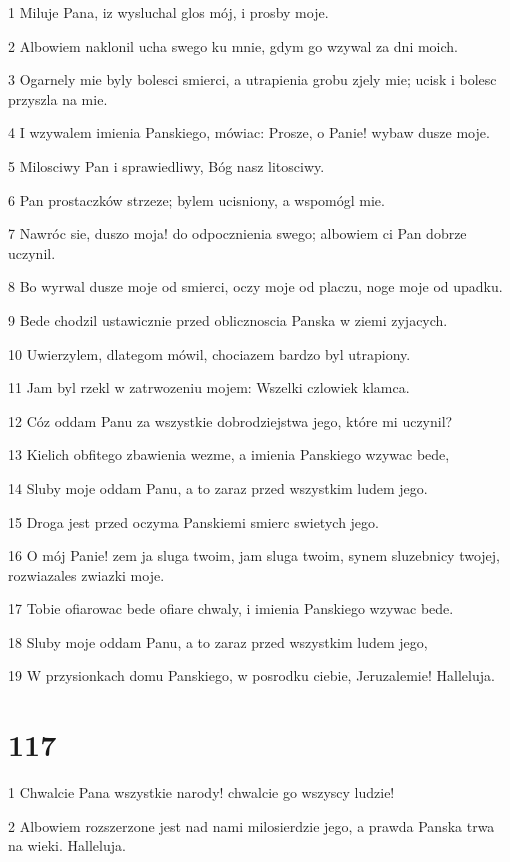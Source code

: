 \par 1 Miluje Pana, iz wysluchal glos mój, i prosby moje.
\par 2 Albowiem naklonil ucha swego ku mnie, gdym go wzywal za dni moich.
\par 3 Ogarnely mie byly bolesci smierci, a utrapienia grobu zjely mie; ucisk i bolesc przyszla na mie.
\par 4 I wzywalem imienia Panskiego, mówiac: Prosze, o Panie! wybaw dusze moje.
\par 5 Milosciwy Pan i sprawiedliwy, Bóg nasz litosciwy.
\par 6 Pan prostaczków strzeze; bylem ucisniony, a wspomógl mie.
\par 7 Nawróc sie, duszo moja! do odpocznienia swego; albowiem ci Pan dobrze uczynil.
\par 8 Bo wyrwal dusze moje od smierci, oczy moje od placzu, noge moje od upadku.
\par 9 Bede chodzil ustawicznie przed oblicznoscia Panska w ziemi zyjacych.
\par 10 Uwierzylem, dlategom mówil, chociazem bardzo byl utrapiony.
\par 11 Jam byl rzekl w zatrwozeniu mojem: Wszelki czlowiek klamca.
\par 12 Cóz oddam Panu za wszystkie dobrodziejstwa jego, które mi uczynil?
\par 13 Kielich obfitego zbawienia wezme, a imienia Panskiego wzywac bede,
\par 14 Sluby moje oddam Panu, a to zaraz przed wszystkim ludem jego.
\par 15 Droga jest przed oczyma Panskiemi smierc swietych jego.
\par 16 O mój Panie! zem ja sluga twoim, jam sluga twoim, synem sluzebnicy twojej, rozwiazales zwiazki moje.
\par 17 Tobie ofiarowac bede ofiare chwaly, i imienia Panskiego wzywac bede.
\par 18 Sluby moje oddam Panu, a to zaraz przed wszystkim ludem jego,
\par 19 W przysionkach domu Panskiego, w posrodku ciebie, Jeruzalemie! Halleluja.

\chapter{117}

\par 1 Chwalcie Pana wszystkie narody! chwalcie go wszyscy ludzie!
\par 2 Albowiem rozszerzone jest nad nami milosierdzie jego, a prawda Panska trwa na wieki. Halleluja.

